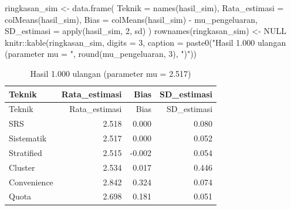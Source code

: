 \documentclass[
  indonesian,
  letterpaper,
]{book}
\newenvironment{Shaded}{\begin{snugshade}}{\end{snugshade}}
\newcommand{\AttributeTok}[1]{\textcolor[rgb]{0.40,0.45,0.13}{#1}}
\newcommand{\ConstantTok}[1]{\textcolor[rgb]{0.56,0.35,0.01}{#1}}
\newcommand{\DecValTok}[1]{\textcolor[rgb]{0.68,0.00,0.00}{#1}}
\newcommand{\FunctionTok}[1]{\textcolor[rgb]{0.28,0.35,0.67}{#1}}
\newcommand{\NormalTok}[1]{\textcolor[rgb]{0.00,0.23,0.31}{#1}}
\newcommand{\OtherTok}[1]{\textcolor[rgb]{0.00,0.23,0.31}{#1}}
\newcommand{\SpecialCharTok}[1]{\textcolor[rgb]{0.37,0.37,0.37}{#1}}
\newcommand{\StringTok}[1]{\textcolor[rgb]{0.13,0.47,0.30}{#1}}
\begin{document}
\begin{Shaded}
\end{Shaded}

\begin{Shaded}
\begin{Highlighting}[]
\NormalTok{ringkasan\_sim }\OtherTok{\textless{}{-}} \FunctionTok{data.frame}\NormalTok{(}
\AttributeTok{Teknik =} \FunctionTok{names}\NormalTok{(hasil\_sim),}
\AttributeTok{Rata\_estimasi =} \FunctionTok{colMeans}\NormalTok{(hasil\_sim),}
\AttributeTok{Bias =} \FunctionTok{colMeans}\NormalTok{(hasil\_sim) }\SpecialCharTok{{-}}\NormalTok{ mu\_pengeluaran,}
\AttributeTok{SD\_estimasi =} \FunctionTok{apply}\NormalTok{(hasil\_sim, }\DecValTok{2}\NormalTok{, sd)}
\NormalTok{)}
\FunctionTok{rownames}\NormalTok{(ringkasan\_sim) }\OtherTok{\textless{}{-}} \ConstantTok{NULL}
\NormalTok{knitr}\SpecialCharTok{::}\FunctionTok{kable}\NormalTok{(ringkasan\_sim, }\AttributeTok{digits =} \DecValTok{3}\NormalTok{,}
\AttributeTok{caption =} \FunctionTok{paste0}\NormalTok{(}\StringTok{"Hasil 1.000 ulangan (parameter mu = "}\NormalTok{, }\FunctionTok{round}\NormalTok{(mu\_pengeluaran, }\DecValTok{3}\NormalTok{), }\StringTok{")"}\NormalTok{))}
\end{Highlighting}
\end{Shaded}

\begin{longtable}[]{@{}lrrr@{}}
\caption{Hasil 1.000 ulangan (parameter mu = 2.517)}\tabularnewline
\toprule\noalign{}
Teknik & Rata\_estimasi & Bias & SD\_estimasi \\
\midrule\noalign{}
\endfirsthead
\toprule\noalign{}
Teknik & Rata\_estimasi & Bias & SD\_estimasi \\
\midrule\noalign{}
\endhead
\bottomrule\noalign{}
\endlastfoot
SRS & 2.518 & 0.000 & 0.080 \\
Sistematik & 2.517 & 0.000 & 0.052 \\
Stratified & 2.515 & -0.002 & 0.054 \\
Cluster & 2.534 & 0.017 & 0.446 \\
Convenience & 2.842 & 0.324 & 0.074 \\
Quota & 2.698 & 0.181 & 0.051 \\
\end{longtable}
\end{document}
